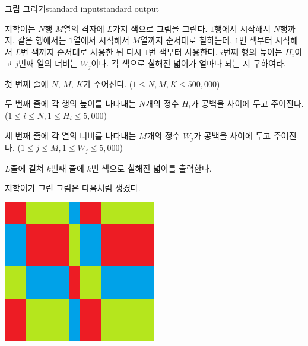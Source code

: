 \begin{problem}{그림 그리기}{standard input}{standard output}

지학이는 $N$행 $M$열의 격자에 $L$가지 색으로 그림을 그린다. $1$행에서 시작해서 $N$행까지, 같은 행에서는 $1$열에서 시작해서 $M$열까지 순서대로 칠하는데, $1$번 색부터 시작해서 $L$번 색까지 순서대로 사용한 뒤 다시 $1$번 색부터 사용한다. $i$번째 행의 높이는 $H_i$이고 $j$번째 열의 너비는 $W_j$이다. 각 색으로 칠해진 넓이가 얼마나 되는 지 구하여라.

\InputFile
첫 번째 줄에 $N$, $M$, $K$가 주어진다. ($1 \le N, M, K \le 500,000$)

두 번째 줄에 각 행의 높이를 나타내는 $N$개의 정수 $H_i$가 공백을 사이에 두고 주어진다. ($1 \le i \le N, 1 \le H_i \le 5,000$)

세 번째 줄에 각 열의 너비를 나타내는 $M$개의 정수 $W_j$가 공백을 사이에 두고 주어진다. ($1 \le j \le M, 1 \le W_j \le 5,000$)

\OutputFile
$L$줄에 걸쳐 $k$번째 줄에 $k$번 색으로 칠해진 넓이를 출력한다.

\Example

\begin{example}
%
\end{example}

\Notes

지학이가 그린 그림은 다음처럼 생겼다.

\begin{center}
  \includegraphics[width=0.5\textwidth]{picture.png}
\end{center}

\end{problem}
